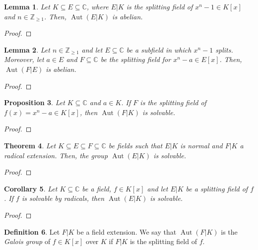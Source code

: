 \documentclass[a4paper, openany]{memoir}
\theoremstyle{definition}
\newtheorem{definition}{Definition}[section]
\theoremstyle{plain}
\newtheorem{theorem}[definition]{Theorem}
\newtheorem{lemma}[definition]{Lemma}
\newtheorem{proposition}[definition]{Proposition}
\newtheorem{corollary}[definition]{Corollary}
\begin{document}
    \begin{lemma}
        Let $K \subseteq E \subseteq \mathbb{C}$, where $E|K$ is the splitting field of $x^n - 1 \in K[x]$ and $n \in \mathbb{Z}_{\geq 1}$. Then, $\operatorname{Aut}(E|K)$ is abelian.
    \end{lemma}
    \begin{proof}
        
    \end{proof}

    \begin{lemma}
        Let $n \in \mathbb{Z}_{\geq 1}$ and let $E \subseteq \mathbb{C}$ be a subfield in which $x^n - 1$ splits. Moreover, let $a \in E$ and $F \subseteq \mathbb{C}$ be the splitting field for $x^n - a \in E[x]$. Then, $\operatorname{Aut}(F|E)$ is abelian.
    \end{lemma}
    \begin{proof}
        
    \end{proof}

    \begin{proposition}
        Let $K \subseteq \mathbb{C}$ and $a \in K$. If $F$ is the splitting field of $f(x) = x^n - a \in K[x]$, then $\operatorname{Aut}(F|K)$ is solvable.
    \end{proposition}
    \begin{proof}
        
    \end{proof}

    \begin{theorem}
        Let $K \subseteq E \subseteq F \subseteq \mathbb{C}$ be fields such that $E|K$ is normal and $F|K$ a radical extension. Then, the group $\operatorname{Aut}(E|K)$ is solvable.
    \end{theorem}
    \begin{proof}
        
    \end{proof}

    \begin{corollary}
        Let $K \subseteq \mathbb{C}$ be a field, $f \in K[x]$ and let $E|K$ be a splitting field of $f$. If $f$ is solvable by radicals, then $\operatorname{Aut}(E|K)$ is solvable.
    \end{corollary}
    \begin{proof}
        
    \end{proof}

    \begin{definition}
        Let $F|K$ be a field extension. We say that $\operatorname{Aut}(F|K)$ is the \emph{Galois group} of $f \in K[x]$ over $K$ if $F|K$ is the splitting field of $f$.
    \end{definition}
\end{document}
